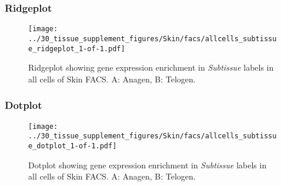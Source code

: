 \clearpage

\subsubsection{Ridgeplot}
\begin{figure}[h]
\centering
\texttt{[image: ../30\_tissue\_supplement\_figures/Skin/facs/allcells\_subtissue\_ridgeplot\_1-of-1.pdf]}

\caption{ Ridgeplot  showing gene expression enrichment in \emph{Subtissue} labels in all cells of Skin FACS. A: Anagen, B: Telogen.}
\end{figure}


\clearpage

\subsubsection{Dotplot}
\begin{figure}[h]
\centering
\texttt{[image: ../30\_tissue\_supplement\_figures/Skin/facs/allcells\_subtissue\_dotplot\_1-of-1.pdf]}

\caption{ Dotplot  showing gene expression enrichment in \emph{Subtissue} labels in all cells of Skin FACS. A: Anagen, B: Telogen.}
\end{figure}

